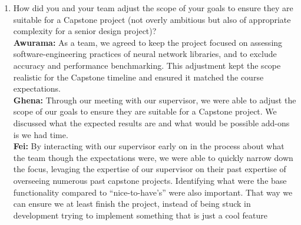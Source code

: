 \documentclass{article}
\begin{document}
\begin{enumerate}
    \item How did you and your team adjust the scope of your goals to ensure
    they are suitable for a Capstone project (not overly ambitious but also of
    appropriate complexity for a senior design project)? \\
    \textbf{Awurama:} As a team, we agreed to keep the project focused on assessing software-engineering practices of neural network libraries, and to exclude accuracy and performance benchmarking. This adjustment kept the scope realistic for the Capstone timeline and ensured it matched the course expectations.  
    \\\textbf{Ghena:} Through our meeting with our supervisor, we were able to adjust the scope of our goals to ensure they are suitable for a Capstone project. We discussed what the expected results are and what would be possible add-ons is we had time.
    \\\textbf{Fei:} By interacting with our supervisor early on in the process about what the team though the expectations were, we were able to quickly narrow down the focus, levaging the expertise of our supervisor on their past expertise of overseeing numerous past capstone projects. Identifying what were the base functionality compared to “nice-to-have’s” were also important. That way we can ensure we at least finish the project, instead of being stuck in development trying to implement something that is just a cool feature
\end{enumerate}  
\end{document}

